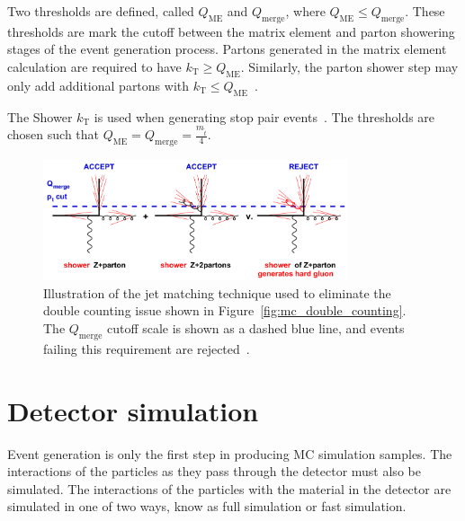 Two thresholds are defined, called $Q_\mathrm{ME}$ and $Q_\mathrm{merge}$,
where $Q_\mathrm{ME} \leq Q_\mathrm{merge}$.
These thresholds are mark the cutoff between the matrix element and parton
showering stages of the event generation process.
Partons generated in the matrix element calculation are required to have
$k_\mathrm{T} \geq Q_\mathrm{ME}$.
Similarly, the parton shower step may only add additional partons with
$k_\mathrm{T} \leq Q_\mathrm{ME}$~\cite{Salam:2010zt}.

The Shower $k_\mathrm{T}$ is used when generating stop pair
events~\cite{Alwall:2008qv}.
The thresholds are chosen such that
$Q_\mathrm{ME} = Q_\mathrm{merge} = \frac{m_{\tilde{t}}}{4}$.

\begin{figure}
  \centering
  \includegraphics[width=0.8\textwidth]{figs/mc_gen/jet_matching.png}
  \caption[
    Illustration of the jet matching technique used to eliminate the double
    counting issue shown in
    Figure~\ref{fig:mc_double_counting}~\cite{Salam:2010zt}.
  ]{
    Illustration of the jet matching technique used to eliminate the double
    counting issue shown in
    Figure~\ref{fig:mc_double_counting}.
    The $Q_\mathrm{merge}$ cutoff scale is shown as a dashed blue line, and
    events failing this requirement are rejected~\cite{Salam:2010zt}.
  }
  \label{fig:mc_jet_matching}
\end{figure}


% 

\FloatBarrier
\section{Detector simulation}
\label{sec:det_sim}

Event generation is only the first step in producing MC simulation samples.
The interactions of the particles as they pass through the detector must also
be simulated.
The interactions of the particles with the material in the detector are
simulated in one of two ways, know as full simulation or fast simulation.

